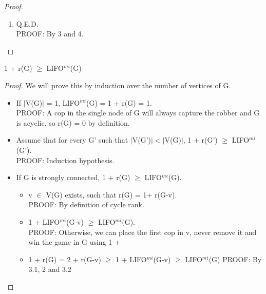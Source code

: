 \begin{proof}
\begin{enumerate}
\begin{enumerate}[label*=\arabic*.]
    \item SS$^{vsc}$(G) = 1 + SS$^{vsc}$(G - v). \\
    PROOF: By 4.1 $\phi$ must be a winning strategy for SS$^{vsc}$(G - v) using SS$^{vsc}$(G)-1 cops.
    
    \item SS$^{vsc}$(G) = 1 + SS$^{vsc}$(G - v) $\geq$ 2 + r(G-v) $\geq$ 1 + r(G). \\
    PROOF: The first equality by 4.2. The second inequality by 2. The last one is by the definition of cycle rank, as r(G) is the smallest r(G-u) + 1, then 1+ r(G-u) $\geq$ r(G) for any u $\in$ V(G).
  \end{enumerate}
  \item Q.E.D. \\
  PROOF: By 3 and 4.
\end{enumerate}
\end{proof}

\begin{lemma}
1 + r(G) $\geq$ LIFO$^{mi}$(G)
\end{lemma}
\begin{proof}
We will prove this by induction over the number of vertices of G.
\begin{itemize}
  \item If $|$V(G)$|$ = 1, LIFO$^{mi}$(G) = 1 + r(G) = 1. \\
  PROOF: A cop in the single node of G will always capture the robber and G is acyclic, so r(G) = 0 by definition.
  \item Assume that for every G' such that  $|$V(G')$| < |$V(G)$|$, 1 + r(G') $\geq$ LIFO$^{mi}$(G'). \\
  PROOF: Induction hypothesis.
  \item If G is strongly connected, 1 + r(G) $\geq$ LIFO$^{mi}$(G).
  \begin{itemize}
    \item v $\in$ V(G) exists, such that r(G) = 1+ r(G-v). \\
    PROOF: By definition of cycle rank.
    \item 1 + LIFO$^{mi}$(G-v) $\geq$ LIFO$^{mi}$(G). \\
    PROOF: Otherwise, we can place the first cop in v, never remove it and win the game in G using 1 +  
    \item  1 + r(G) = 2 + r(G-v) $\geq$ 1 + LIFO$^{mi}$(G-v) $\geq$ LIFO$^{mi}$(G)
    PROOF: By 3.1, 2 and 3.2
  \end{itemize}
\end{itemize}
\end{proof}